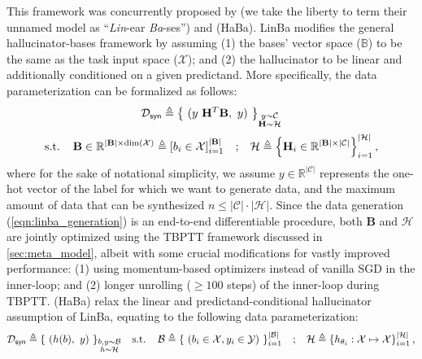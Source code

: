 \documentclass[10pt]{article} %
\begin{document}
This framework was concurrently proposed by \citet{remember_past} (we take the liberty to term their unnamed model as ``\emph{Lin}-ear \emph{Ba}-ses'') and \citet{haba} (HaBa). LinBa modifies the general hallucinator-bases framework by assuming (1) the bases' vector space ($\mathbb{B}$) to be the same as the task input space ($\mathcal{X}$); and (2) the hallucinator to be linear and additionally conditioned on a given predictand. More specifically, the data parameterization can be formalized as follows:
\begin{equation} \label{eqn:linba_generation}
\begin{gathered}
    \distill \triangleq \left\{ ~ (y \ \mathbf{H}^T\mathbf{B}, ~y) ~ \right\}_{\raisebox{6pt}{$\substack{y \sim \mathcal{C}\\\mathbf{H} \sim \mathcal{H}}$}} \\
    \text{s.t.} \hspace{0.4cm}
    \mathbf{B} \in \mathbb{R}^{|\mathbf{B}| \times \dim(\mathcal{X})} \triangleq \left[ b_i \in \mathcal{X} \right]_{i=1}^{|\mathbf{B}|}
    \hspace{0.3cm} ; \hspace{0.3cm} 
    \mathcal{H} \triangleq \left\{ \mathbf{H}_i \in \mathbb{R}^{|\mathbf{B}| \times |\mathcal{C}|} \right\}_{i=1}^{|\mathcal{H}|},
\end{gathered}
\end{equation}
where for the sake of notational simplicity, we assume $y \in \mathbb{R}^{|\mathcal{C}|}$ represents the one-hot vector of the label for which we want to generate data, and the maximum amount of data that can be synthesized $n \leq |\mathcal{C}|\cdot|\mathcal{H}|$. Since the data generation (\cref{eqn:linba_generation}) is an end-to-end differentiable procedure, both $\mathbf{B}$ and $\mathcal{H}$ are jointly optimized using the TBPTT framework discussed in \cref{sec:meta_model}, albeit with some crucial modifications for vastly improved performance: (1) using momentum-based optimizers instead of vanilla SGD in the inner-loop; and (2) longer unrolling ($\geq 100$ steps) of the inner-loop during TBPTT. \citet{haba} (HaBa) relax the linear and predictand-conditional hallucinator assumption of LinBa, equating to the following data parameterization:
\begin{equation} \label{eqn:haba_generation}
\begin{gathered}
    \distill \triangleq \left\{ ~ (h(b), ~y) ~ \right\}_{\raisebox{6pt}{$\substack{b, y \sim \mathcal{B}\\h \sim \mathcal{H}}$}}
    \hspace{0.3cm} \text{s.t.} \hspace{0.4cm}
    \mathcal{B} \triangleq \left\{ ~ (b_i \in \mathcal{X}, y_i \in \mathcal{Y}) ~ \right\}_{i=1}^{|\mathcal{B}|}
    \hspace{0.3cm} ; \hspace{0.3cm} 
    \mathcal{H} \triangleq \left\{ h_{\theta_i} : \mathcal{X} \mapsto \mathcal{X} \right\}_{i=1}^{|\mathcal{H}|},
\end{gathered}
\end{equation}
\end{document}
